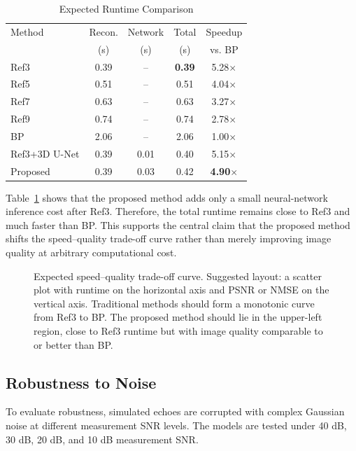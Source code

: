 \documentclass[journal]{IEEEtran}
\begin{document}
\begin{table}[t]
\caption{Expected Runtime Comparison}
\label{tab:runtime}
\centering
\begin{tabular}{lcccc}
\hline
Method & Recon. & Network & Total & Speedup \\
 & (s) & (s) & (s) & vs. BP \\
\hline
Ref3 & 0.39 & -- & \textbf{0.39} & 5.28$\times$ \\
Ref5 & 0.51 & -- & 0.51 & 4.04$\times$ \\
Ref7 & 0.63 & -- & 0.63 & 3.27$\times$ \\
Ref9 & 0.74 & -- & 0.74 & 2.78$\times$ \\
BP & 2.06 & -- & 2.06 & 1.00$\times$ \\
Ref3+3D U-Net & 0.39 & 0.01 & 0.40 & 5.15$\times$ \\
Proposed & 0.39 & 0.03 & 0.42 & \textbf{4.90$\times$} \\
\hline
\end{tabular}
\end{table}

Table~\ref{tab:runtime} shows that the proposed method adds only a small neural-network inference cost after Ref3. Therefore, the total runtime remains close to Ref3 and much faster than BP. This supports the central claim that the proposed method shifts the speed--quality trade-off curve rather than merely improving image quality at arbitrary computational cost.

\begin{figure}[t]
\centering
{}
\caption{Expected speed--quality trade-off curve. Suggested layout: a scatter plot with runtime on the horizontal axis and PSNR or NMSE on the vertical axis. Traditional methods should form a monotonic curve from Ref3 to BP. The proposed method should lie in the upper-left region, close to Ref3 runtime but with image quality comparable to or better than BP.}
\label{fig:speed_quality_curve}
\end{figure}

\subsection{Robustness to Noise}
\label{subsec:noise_robustness}

To evaluate robustness, simulated echoes are corrupted with complex Gaussian noise at different measurement SNR levels. The models are tested under 40 dB, 30 dB, 20 dB, and 10 dB measurement SNR.
\end{document}
